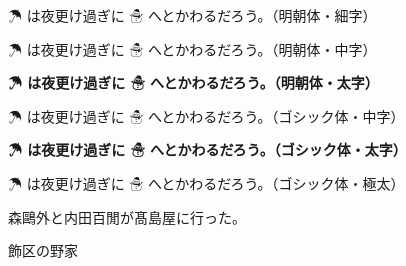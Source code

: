 \documentclass[uplatex,a4paper]{jsarticle}
\begin{document}
{\mcfamily\ltseries ☂ は夜更け過ぎに ☃ へとかわるだろう。（明朝体・細字）}\par
{\mcfamily          ☂ は夜更け過ぎに ☃ へとかわるだろう。（明朝体・中字）}\par
{\mcfamily\bfseries ☂ は夜更け過ぎに ☃ へとかわるだろう。（明朝体・太字）}\par

{\gtfamily          ☂ は夜更け過ぎに ☃ へとかわるだろう。（ゴシック体・中字）}\par
{\gtfamily\bfseries ☂ は夜更け過ぎに ☃ へとかわるだろう。（ゴシック体・太字）}\par
{\gtfamily\ebseries ☂ は夜更け過ぎに ☃ へとかわるだろう。（ゴシック体・極太）}

森鷗外と内田百閒が髙島屋に行った。

飾区の野家  %
\end{document}
